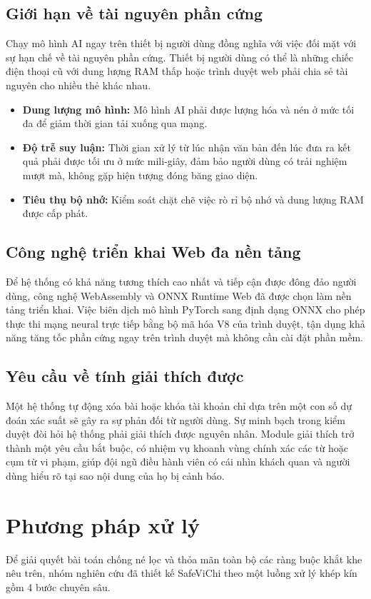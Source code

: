 \documentclass[12pt,a4paper]{article}
\begin{document}
\subsection{Giới hạn về tài nguyên phần cứng}
Chạy mô hình AI ngay trên thiết bị người dùng đồng nghĩa với việc đối mặt với sự hạn chế về tài nguyên phần cứng. Thiết bị người dùng có thể là những chiếc điện thoại cũ với dung lượng RAM thấp hoặc trình duyệt web phải chia sẻ tài nguyên cho nhiều thẻ khác nhau.
\begin{itemize}
    \item \textbf{Dung lượng mô hình:} Mô hình AI phải được lượng hóa và nén ở mức tối đa để giảm thời gian tải xuống qua mạng.
    \item \textbf{Độ trễ suy luận:} Thời gian xử lý từ lúc nhận văn bản đến lúc đưa ra kết quả phải được tối ưu ở mức mili-giây, đảm bảo người dùng có trải nghiệm mượt mà, không gặp hiện tượng đóng băng giao diện.
    \item \textbf{Tiêu thụ bộ nhớ:} Kiểm soát chặt chẽ việc rò rỉ bộ nhớ và dung lượng RAM được cấp phát.
\end{itemize}

\subsection{Công nghệ triển khai Web đa nền tảng}
Để hệ thống có khả năng tương thích cao nhất và tiếp cận được đông đảo người dùng, công nghệ WebAssembly và ONNX Runtime Web đã được chọn làm nền tảng triển khai. Việc biên dịch mô hình PyTorch sang định dạng ONNX cho phép thực thi mạng neural trực tiếp bằng bộ mã hóa V8 của trình duyệt, tận dụng khả năng tăng tốc phần cứng ngay trên trình duyệt mà không cần cài đặt phần mềm.

\subsection{Yêu cầu về tính giải thích được}
Một hệ thống tự động xóa bài hoặc khóa tài khoản chỉ dựa trên một con số dự đoán xác suất sẽ gây ra sự phản đối từ người dùng. Sự minh bạch trong kiểm duyệt đòi hỏi hệ thống phải giải thích được nguyên nhân. Module giải thích trở thành một yêu cầu bắt buộc, có nhiệm vụ khoanh vùng chính xác các từ hoặc cụm từ vi phạm, giúp đội ngũ điều hành viên có cái nhìn khách quan và người dùng hiểu rõ tại sao nội dung của họ bị cảnh báo.

\newpage
\section{Phương pháp xử lý}
Để giải quyết bài toán chống né lọc và thỏa mãn toàn bộ các ràng buộc khắt khe nêu trên, nhóm nghiên cứu đã thiết kế SafeViChi theo một luồng xử lý khép kín gồm 4 bước chuyên sâu.
\end{document}
